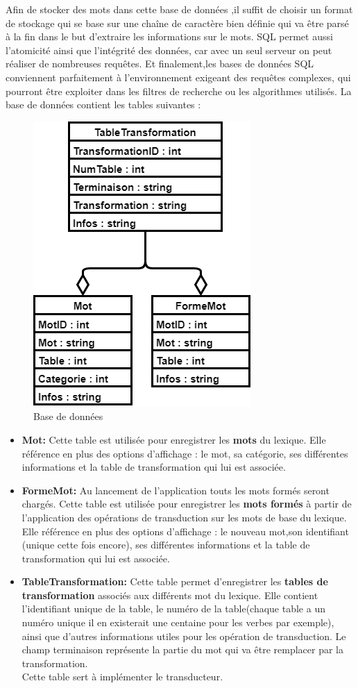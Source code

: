 \documentclass[a4paper, 12pt]{article}
\begin{document}
Afin de stocker des mots dans cette base de données ,il suffit de choisir un format de stockage qui se base sur une chaîne de caractère bien définie qui va être parsé à la fin dans le but d'extraire les informations sur le mots.
SQL permet aussi l’atomicité ainsi que l’intégrité des données, car avec un seul serveur on peut réaliser de nombreuses requêtes.
Et finalement,les bases de données SQL conviennent parfaitement à l’environnement exigeant des requêtes complexes, qui pourront être exploiter
dans les filtres de recherche ou les algorithmes utilisés.
La base de données contient les tables suivantes :
\begin{figure}[H]
    \centerline{\includegraphics[scale=0.65]{bdd.png}}
    \caption{Base de données}
\end{figure}
\begin{itemize}
    \item \textbf{Mot:}
    Cette table est utilisée pour enregistrer les \textbf{mots} du lexique. Elle référence en plus des options d'affichage : le mot, sa catégorie, ses différentes informations et la table de transformation qui lui est associée.
    \item \textbf{FormeMot:}
    Au lancement de l'application touts les mots formés seront chargés.
    Cette table est utilisée pour enregistrer les \textbf{mots formés} à partir de l'application des opérations de transduction sur les mots de base du lexique. Elle référence en plus des options d'affichage : le nouveau mot,son identifiant (unique cette fois encore), ses différentes informations et la table de transformation qui lui est associée.
    \item \textbf{TableTransformation:}
    Cette table permet d'enregistrer les \textbf{tables de transformation} associés aux différents mot du lexique. Elle contient l'identifiant unique de la table, le numéro de la table(chaque table a un numéro unique il en existerait une centaine pour les verbes par exemple), ainsi que d'autres informations utiles pour les opération de transduction.
    Le champ terminaison représente la partie du mot qui va être remplacer par la transformation.\\
    Cette table sert à implémenter le transducteur.
\end{itemize}
\end{document}
